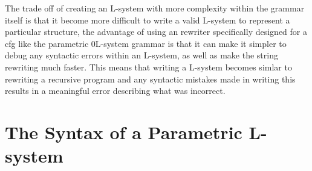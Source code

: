 \begin{flushleft}
\vspace{5mm}

The trade off of creating an L-system with more complexity within the grammar itself is that it become more difficult to write a valid L-system to represent a particular structure, the advantage of using an rewriter specifically designed for a \acrshort{cfg} like the parametric 0L-system grammar is that it can make it simpler to debug any syntactic errors within an L-system, as well as make the string rewriting much faster. This means that writing a L-system becomes simlar to rewriting a recursive program and any syntactic mistakes made in writing this  results in a meaningful error describing what was incorrect. \\

\end{flushleft}

\section{The Syntax of a Parametric L-system}

